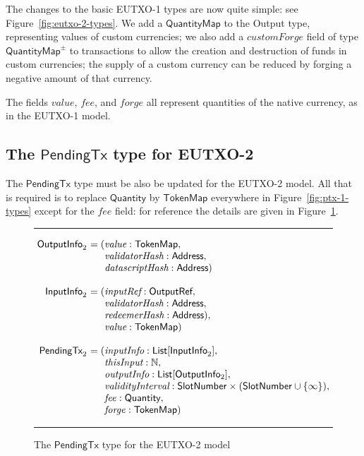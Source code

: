 \documentclass[a4paper]{article}
\renewcommand{\i}{\textit}  %
\newcommand{\s}{\textsf}  %
\newenvironment{arraydefs}[1]{\setlength{\arraycolsep}{0pt}\begin{array}{#1}}{\end{array}}
\newcommand\rfskip{7pt}
\newenvironment{ruledfigure}[1]{\begin{figure}[#1]\hrule\vspace{\rfskip}}{\vspace{\rfskip}\hrule\end{figure}}
\newcommand{\List}[1]{\ensuremath{\s{List}[#1]}}
\newcommand{\ptx}{\ensuremath{\s{PendingTx}}}
\newcommand{\mi}[1]{\ensuremath{\mathit{#1}}}
\newcommand{\forge}{\mi{forge}}
\newcommand{\fee}{\mi{fee}}
\newcommand{\val}{\mi{value}}  %
\newcommand{\customforge}{\mi{customForge}}
\newcommand{\msf}[1]{\ensuremath{\mathsf{#1}}}
\newcommand{\slotnum}{\msf{SlotNumber}}
\newcommand{\qty}{\ensuremath{\s{Quantity}}}
\newcommand{\qtymap}{\ensuremath{\s{QuantityMap}}}
\newcommand{\tokenmap}{\ensuremath{\s{TokenMap}}}
\newcommand\N{\ensuremath{\mathbb{N}}}
\begin{document}
\noindent The changes to the basic EUTXO-1 types are now quite simple:
see Figure~\ref{fig:eutxo-2-types}.  We add a \qtymap{} to the
\s{Output} type, representing values of custom currencies; we also add
a \customforge{} field of type $\qtymap^{\pm}$ to transactions to
allow the creation and destruction of funds in custom currencies; the
supply of a custom currency can be reduced by forging a negative
amount of that currency.

The fields \val, \fee, and \forge{} all represent quantities of the
native currency, as in the EUTXO-1 model.

\subsection{The $\ptx$ type for EUTXO-2}
\label{sec:pendingtx-2}
The $\ptx$ type must be also be updated for the EUTXO-2 model.  All
that is required is to replace $\qty$ by $\tokenmap$ everywhere in
Figure~\ref{fig:ptx-1-types} except for the $\fee$ field: for reference
the details are given in Figure~\ref{fig:ptx-2-types}.
\begin{ruledfigure}{H}
  \[
  \begin{arraydefs}{rll}
    
    \s{OutputInfo}_2\s{ } &= (& \i{value}: \tokenmap,\\
    && \i{validatorHash}: \s{Address},\\
    &&  \i{datascriptHash}: \s{Address})\\
    \\
    \s{InputInfo}_2\s{ }& = (&\i{inputRef}: \s{OutputRef},\\
                 && \i{validatorHash}: \s{Address},\\
                 && \i{redeemerHash}: \s{Address}),\\
                 && \i{value}: \tokenmap)\\
     \\
     \ptx_2\s{ } &= (&\i{inputInfo}: \List{\s{InputInfo}_2},\\
     &&\i{thisInput}: \N,\\
     &&\i{outputInfo}: \List{\s{OutputInfo$_2$}},\\
     &&\i{validityInterval}: \slotnum \times (\slotnum \cup \{\infty\}),\\
     &&\fee: \qty,\\
     &&\forge: \tokenmap)
   \end{arraydefs}
 \]
  \caption{The $\ptx$ type for the EUTXO-2 model}
  \label{fig:ptx-2-types}
\end{ruledfigure}
\end{document}
